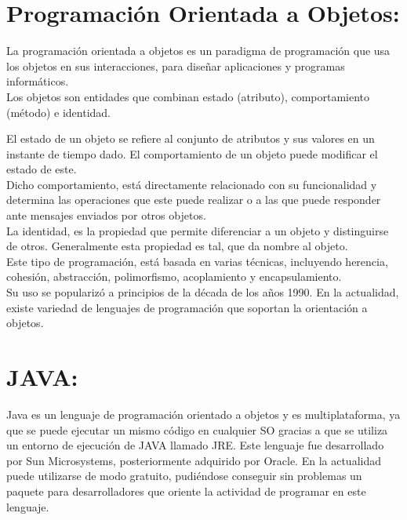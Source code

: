 \documentclass[12pt,oneside]{book}
\begin{document}
	\section{Programación Orientada a Objetos:}
	
	La programación orientada a objetos es un paradigma de programación que usa los objetos en sus interacciones, para diseñar aplicaciones y programas informáticos. \\
	
	
	Los objetos son entidades que combinan estado (atributo), comportamiento (método) e identidad.
	
	El estado de un objeto se refiere al conjunto de atributos y sus valores en un instante de tiempo dado. El comportamiento de un objeto puede modificar el estado de este.\\
	
	Dicho comportamiento, está directamente relacionado con su funcionalidad y determina las operaciones que este puede realizar o a las que puede responder ante mensajes enviados por otros objetos. \\
	
	La identidad, es la propiedad que permite diferenciar a un objeto y distinguirse de otros. Generalmente esta propiedad es tal, que da nombre al objeto. \\
	
	Este tipo de programación, está basada en varias técnicas, incluyendo herencia, cohesión, abstracción, polimorfismo, acoplamiento y encapsulamiento.\\
	
	Su uso se popularizó a principios de la década de los años 1990. En la actualidad, existe variedad de lenguajes de programación que soportan la orientación a objetos.
	
	\section{JAVA:} 
	
	Java es un lenguaje de programación orientado a objetos y es multiplataforma, ya que se puede ejecutar un mismo código en cualquier SO gracias a que se utiliza un entorno de ejecución de JAVA llamado JRE.
	Este lenguaje fue desarrollado por Sun Microsystems, posteriormente adquirido por Oracle. En la actualidad puede utilizarse de modo gratuito, pudiéndose conseguir sin problemas un paquete para desarrolladores que oriente la actividad de programar en este lenguaje. \\
	
\end{document}
